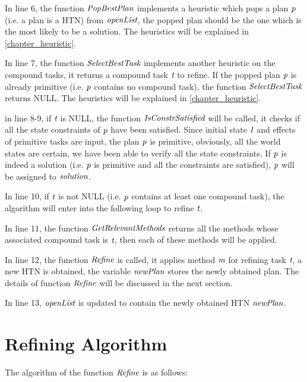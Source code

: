 In line 6, the function $\emph{PopBestPlan}$ implements a heuristic which pops a plan $\emph{p}$ (i.e. a plan is a HTN) from $\emph{openList}$, the popped plan should be the one which is the most likely to be a solution. The heuristics will be explained in \autoref{chapter_heuristic}.

In line 7, the function $\emph{SelectBestTask}$ implements another heuristic on the compound tasks, it returns a compound task $\emph{t}$ to refine. If the popped plan $\emph{p}$ is already primitive (i.e. $\emph{p}$ contains no compound task), the function $\emph{SelectBestTask}$ returns NULL. The heuristics will be explained in \autoref{chapter_heuristic}.

in line 8-9, if $\emph{t}$ is NULL, the function $\emph{IsConstrSatisfied}$ will be called, it checks if all the state constraints of $\emph{p}$ have been satisfied. Since initial state $\emph{I}$ and effects of primitive tasks are input, the plan $\emph{p}$ is primitive, obviously, all the world states are certain, we have been able to verify all the state constraints. If $\emph{p}$ is indeed a solution (i.e. $\emph{p}$ is primitive and all the constraints are satisfied), $\emph{p}$ will be assigned to $\emph{solution}$.  

In line 10, if $\emph{t}$ is not NULL (i.e. $\emph{p}$ contains at least one compound task), the algorithm will enter into the following loop to refine $\emph{t}$.

In line 11, the function $\emph{GetRelevantMethods}$ returns all the  methods whose associated compound task is $\emph{t}$, then each of these methods will be applied.

In line 12, the function $\emph{Refine}$ is called, it applies method $\emph{m}$ for refining task $\emph{t}$, a new HTN is obtained, the variable $\emph{newPlan}$ stores the newly obtained plan. The details of function $\emph{Refine}$ will be discussed in the next section.

In line 13, $\emph{openList}$ is updated to contain the newly obtained HTN $\emph{newPlan}$.

\section{Refining Algorithm}
The algorithm of the function $\emph{Refine}$ is as follows:

